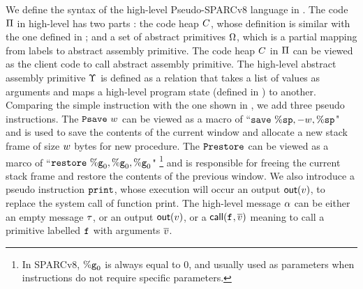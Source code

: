 We define the syntax of the high-level Pseudo-SPARCv8 language 
in \Fig{\ref{fig:syntax-of-concur-pseudo-sparc}}. 
The code $\Pi$ in high-level has two parts : 
the code heap $C$, whose definition is similar with  
the one defined 
in \Fig{\ref{fig:Machine States and Language for SPARC Code}}; 
and a set of abstract primitives $\Omega$, 
which is a partial mapping from labels to 
abstract assembly primitive. The code heap $C$ in $\Pi$ 
can be viewed as the client code to 
call abstract assembly primitive. 
The high-level abstract assembly primitive $\Upsilon$ 
is defined as a relation that takes a list of values 
as arguments and maps a high-level program state 
(defined in \Fig{\ref{fig:machine-state-concur-pseudo-sparc}}) 
to another. 
Comparing the simple instruction with the one shown in 
\Fig{\ref{fig:Machine States and Language for SPARC Code}}, 
we add three pseudo instructions. The $\texttt{Psave} \ w$ 
can be viewed as a macro of 
``$\texttt{save}{} \ \%\texttt{sp}, -w, \%\texttt{sp}$" and 
is used to save the contents of the current window and 
allocate a new stack frame of size $w$ bytes for new procedure. 
The $\texttt{Prestore}$ can be viewed as a marco of 
``$\crestore{} \ \greg{0}, \greg{0}, \greg{0}$"
\footnote{In SPARCv8, $\%\texttt{g}_{0}$ is always equal to 0, 
and usually used as parameters when instructions do not 
require specific parameters.} 
and is responsible for 
freeing the current stack frame and 
restore the contents of the previous window. 
We also introduce a pseudo instruction $\texttt{print}$, 
whose execution will occur an output $\textsf{out}({v})$, 
to replace the system call of function print. 
The high-level message 
$\alpha$ can be either an empty message $\tau$, or an output 
$\textsf{out}({v})$, or a $\textsf{call}({\texttt{f}_{}, \overline{v}})$ meaning to 
call a primitive labelled $\texttt{f}_{}$ with arguments $\overline{v}$. 

